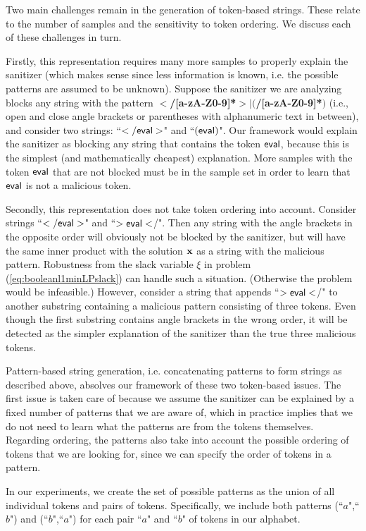 Two main challenges remain in the generation of token-based strings. These relate to the number of samples and the sensitivity to token ordering. We discuss each of these challenges in turn.

 Firstly, this representation requires many more samples to properly explain the sanitizer (which makes sense since less information is known, i.e. the possible patterns are assumed to be unknown). Suppose the sanitizer we are analyzing blocks any string with the pattern \textbf{$<$/[a-zA-Z0-9]*$>$$|$$($/[a-zA-Z0-9]*$)$} (i.e., open and close angle brackets or parentheses with alphanumeric text in between), and consider two strings: ``$\sf{</eval>}$" and ``$\sf{(eval)}$". Our framework would explain the sanitizer as blocking any string that contains the token $\sf{eval}$, because this is the simplest (and mathematically cheapest) explanation. More samples with the token $\sf{eval}$ that are not blocked must be in the sample set in order to learn that $\sf{eval}$ is not a malicious token.

Secondly, this representation does not take token ordering into account. Consider strings ``$\sf{</eval>}$" and ``$\sf{>eval<}$/". Then any string with the angle brackets in the opposite order will obviously not be blocked by the sanitizer, but will have the same inner product with the solution $\mathbf{x}$ as a string with the malicious pattern. Robustness from the slack variable $\xi$ in problem (\ref{eq:booleanl1minLPslack}) can handle such a situation. (Otherwise the problem would be infeasible.) However, consider a string that appends ``$\sf{>eval<}$/" to another substring containing a malicious pattern consisting of three tokens.  Even though the  first substring contains angle brackets in the wrong order, it will be detected as the simpler explanation of the sanitizer than the true three malicious tokens.

Pattern-based string generation, i.e. concatenating patterns to form strings as described above, absolves our framework of these two token-based issues. The first issue is taken care of because we assume the sanitizer can be explained by a fixed number of patterns that we are aware of, which in practice implies that we do not need to learn what the patterns are from the tokens themselves. Regarding ordering, the patterns also take into account the possible ordering of tokens that we are looking for, since we can specify the order of tokens in a pattern.

In our experiments, we create the set of possible patterns as the union of all individual tokens and pairs of tokens. Specifically, we include both patterns (``$a$",``$b$") and (``$b$",``$a$") for each pair ``$a$" and ``$b$" of tokens in our alphabet.

